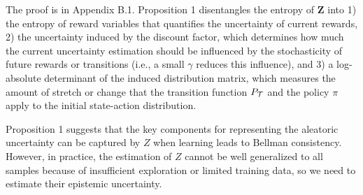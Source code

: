 \documentclass{article}
\newcommand{\horizon}{T_{H}}
\newcommand{\state}{s}
\newcommand{\action}{a}
\newcommand{\transition}{t}
\newcommand{\reward}{r}
\newcommand{\dataset}{\mathcal{D}}
\newcommand{\expect}{\mathbb{E}}
\newtheorem{proposition}{Proposition}
\DeclareMathOperator*{\argmax}{argmax}
\begin{document}
The proof is in Appendix B.1. Proposition 1 disentangles the entropy of $\boldsymbol{Z}$ into 1) the entropy of reward variables that quantifies the uncertainty of current rewards, 2) the uncertainty induced by the discount factor, which determines how much the current uncertainty estimation should be influenced by the stochasticity of future rewards or transitions (i.e., a small $\gamma$ reduces this influence), and 3) a log-absolute determinant of the induced distribution matrix, which measures the amount of stretch or change that the transition function $P_{\mathcal{\MakeUppercase{\transition}}}$ and the policy $\pi$ apply to the initial state-action distribution.

Proposition 1 suggests that the key components for representing the aleatoric uncertainty can be captured by $Z$ when learning leads to Bellman consistency.  However, in practice,  the estimation of $Z$ cannot be well generalized to all samples because of insufficient exploration or limited training data, so we need to estimate their epistemic uncertainty. 


\end{document}

